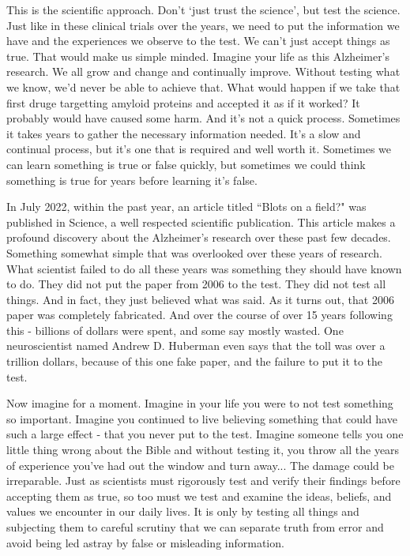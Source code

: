 \documentclass[10pt]{article}
\begin{document}
\begin{multicols}{2}
This is the scientific approach. Don't `just trust the science', but test the science. Just like in these clinical trials over the years, we need to put the information we have and the experiences we observe to the test. We can't just accept things as true. That would make us simple minded. Imagine your life as this Alzheimer's research. We all grow and change and continually improve. Without testing what we know, we'd never be able to achieve that. What would happen if we take that first druge targetting amyloid proteins and accepted it as if it worked? It probably would have caused some harm. And it's not a quick process. Sometimes it takes years to gather the necessary information needed. It's a slow and continual process, but it's one that is required and well worth it. Sometimes we can learn something is true or false quickly, but sometimes we could think something is true for years before learning it's false.

In July 2022, within the past year, an article titled ``Blots on a field?" was published in Science\cite{Charles}, a well respected scientific publication. This article makes a profound discovery about the Alzheimer's research over these past few decades. Something somewhat simple that was overlooked over these years of research. What scientist failed to do all these years was something they should have known to do. They did not put the paper from 2006 to the test. They did not test all things. And in fact, they just believed what was said. As it turns out, that 2006 paper was completely fabricated. And over the course of over 15 years following this - billions of dollars were spent, and some say mostly wasted. One neuroscientist named Andrew D. Huberman even says that the toll was over a trillion dollars, because of this one fake paper, and the failure to put it to the test.

Now imagine for a moment. Imagine in your life you were to not test something so important. Imagine you continued to live believing something that could have such a large effect - that you never put to the test. Imagine someone tells you one little thing wrong about the Bible and without testing it, you throw all the years of experience you've had out the window and turn away... The damage could be irreparable. Just as scientists must rigorously test and verify their findings before accepting them as true, so too must we test and examine the ideas, beliefs, and values we encounter in our daily lives. It is only by testing all things and subjecting them to careful scrutiny that we can separate truth from error and avoid being led astray by false or misleading information.


\end{multicols}
\end{document}
